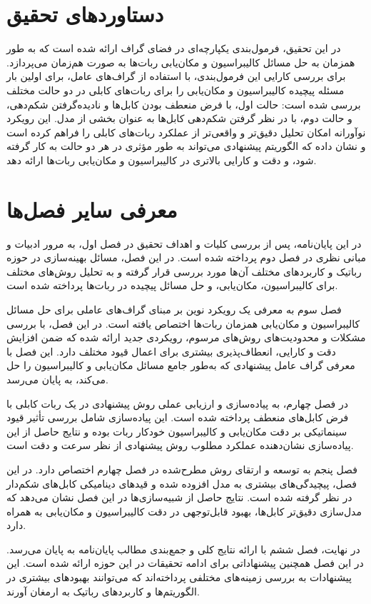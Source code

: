 \section{دستاورد‌های تحقیق}
در این تحقیق، فرمول‌بندی یکپارچه‌ای در فضای گراف ارائه شده است که به طور همزمان به حل مسائل کالیبراسیون و مکان‌یابی ربات‌ها به صورت هم‌زمان می‌پردازد. برای بررسی کارایی این فرمول‌بندی، با استفاده از گراف‌های عامل، برای اولین بار مسئله پیچیده کالیبراسیون و مکان‌یابی را برای ربات‌های کابلی در دو حالت مختلف بررسی شده است: حالت اول، با فرض منعطف بودن کابل‌ها و نادیده‌گرفتن شکم‌دهی، و حالت دوم، با در نظر گرفتن شکم‌دهی کابل‌ها به عنوان بخشی از مدل. این رویکرد نوآورانه امکان تحلیل دقیق‌تر و واقعی‌تر از عملکرد ربات‌های کابلی را فراهم کرده است و نشان داده که الگوریتم پیشنهادی می‌تواند به طور مؤثری در هر دو حالت به کار گرفته شود، و دقت و کارایی بالاتری در کالیبراسیون و مکان‌یابی ربات‌ها ارائه دهد.

\section{معرفی سایر فصل‌ها}
در این پایان‌نامه، پس از بررسی کلیات و اهداف تحقیق در فصل اول، به مرور ادبیات و مبانی نظری در فصل دوم پرداخته‌ شده‌ است. در این فصل، مسائل بهینه‌سازی در حوزه رباتیک و کاربردهای مختلف آن‌ها مورد بررسی قرار گرفته و به تحلیل روش‌های مختلف برای کالیبراسیون، مکان‌یابی، و حل مسائل پیچیده در ربات‌ها پرداخته شده است.

فصل سوم به معرفی یک رویکرد نوین بر مبنای گراف‌های عاملی برای حل مسائل کالیبراسیون و مکان‌یابی همزمان ربات‌ها اختصاص یافته است. در این فصل، با بررسی مشکلات و محدودیت‌های روش‌های مرسوم، رویکردی جدید ارائه شده که ضمن افزایش دقت و کارایی، انعطاف‌پذیری بیشتری برای اعمال قیود مختلف دارد. این فصل با معرفی گراف عامل پیشنهادی که به‌طور جامع مسائل مکان‌یابی و کالیبراسیون را حل می‌کند، به پایان می‌رسد.

در فصل چهارم، به پیاده‌سازی و ارزیابی عملی روش پیشنهادی در یک ربات کابلی با فرض کابل‌های منعطف پرداخته شده است. این پیاده‌سازی شامل بررسی تأثیر قیود سینماتیکی بر دقت مکان‌یابی و کالیبراسیون خودکار ربات بوده و نتایج حاصل از این پیاده‌سازی نشان‌دهنده عملکرد مطلوب روش پیشنهادی از نظر سرعت و دقت است.

فصل پنجم به توسعه و ارتقای روش مطرح‌شده در فصل چهارم اختصاص دارد. در این فصل، پیچیدگی‌های بیشتری به مدل افزوده شده و قیدهای دینامیکی کابل‌های شکم‌دار در نظر گرفته شده است. نتایج حاصل از شبیه‌سازی‌ها در این فصل نشان می‌دهد که مدل‌سازی دقیق‌تر کابل‌ها، بهبود قابل‌توجهی در دقت کالیبراسیون و مکان‌یابی به همراه دارد.

در نهایت، فصل ششم با ارائه نتایج کلی و جمع‌بندی مطالب پایان‌نامه به پایان می‌رسد. در این فصل همچنین پیشنهاداتی برای ادامه تحقیقات در این حوزه ارائه شده است. این پیشنهادات به بررسی زمینه‌های مختلفی پرداخته‌اند که می‌توانند بهبود‌های بیشتری در الگوریتم‌ها و کاربردهای رباتیک به ارمغان آورند.




